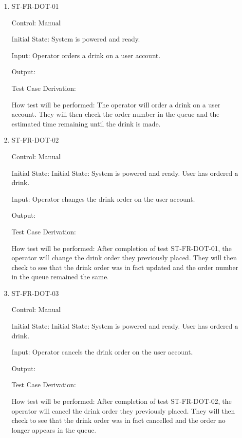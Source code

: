 \documentclass[12pt, titlepage]{article}
\begin{document}
\begin{enumerate}

\item{ST-FR-DOT-01\\}

Control: Manual
					
Initial State: System is powered and ready.
					
Input: Operator orders a drink on a user account.
					
Output: 

Test Case Derivation: 
					
How test will be performed: The operator will order a drink on a user account. They will then check the order number in the queue and the estimated time remaining until the drink is made.
					
\item{ST-FR-DOT-02\\}

Control: Manual

Initial State: Initial State: System is powered and ready. User has ordered a drink.

Input: Operator changes the drink order on the user account.

Output: 

Test Case Derivation: 

How test will be performed: After completion of test ST-FR-DOT-01, the operator will change the drink order they previously placed. They will then check to see that the drink order was in fact updated and the order number in the queue remained the same.

\item{ST-FR-DOT-03\\}

Control: Manual

Initial State: Initial State: System is powered and ready. User has ordered a drink.

Input: Operator cancels the drink order on the user account.

Output: 

Test Case Derivation: 

How test will be performed: After completion of test ST-FR-DOT-02, the operator will cancel the drink order they previously placed. They will then check to see that the drink order was in fact cancelled and the order no longer appears in the queue.

\end{enumerate}
\end{document}
